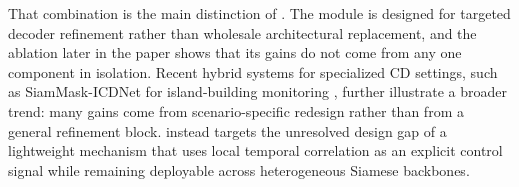 That combination is the main distinction of \cosa{}. The module is designed for targeted decoder refinement rather than wholesale architectural replacement, and the ablation later in the paper shows that its gains do not come from any one component in isolation. Recent hybrid systems for specialized CD settings, such as SiamMask-ICDNet for island-building monitoring \cite{lebao2025}, further illustrate a broader trend: many gains come from scenario-specific redesign rather than from a general refinement block. \cosa{} instead targets the unresolved design gap of a lightweight mechanism that uses local temporal correlation as an explicit control signal while remaining deployable across heterogeneous Siamese backbones.
